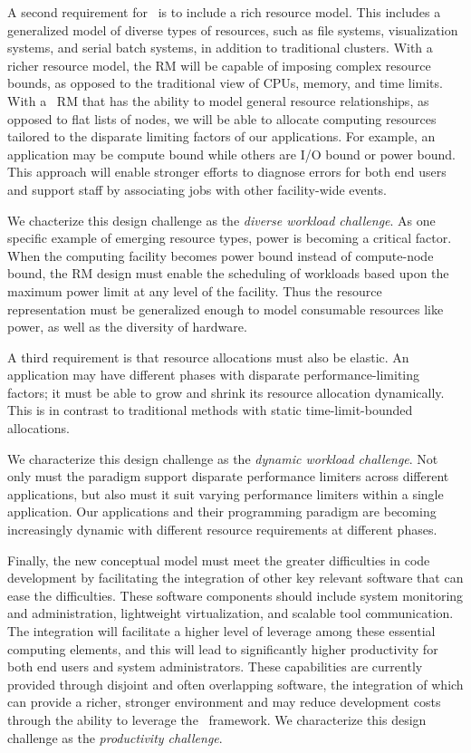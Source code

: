 A second requirement for \flux\ is to include a rich resource model.
This includes a generalized model of diverse types of resources,
such as file systems, visualization systems, and serial batch systems,
in addition to traditional clusters.   With a richer resource model,
the RM will be capable of imposing complex resource bounds,
as opposed to the traditional view of CPUs, memory, and time limits.
With a \flux\ RM that has the ability to model general resource
relationships, as opposed to flat lists of nodes, we will be able
to allocate computing resources tailored to the disparate limiting
factors of our applications.  For example, an application may be
compute bound while others are I/O bound or power bound.
This approach will enable stronger efforts to diagnose errors
for both end users and support staff by associating jobs
with other facility-wide events.

We chacterize this design challenge as the {\em diverse workload
challenge}.   As one specific example of emerging resource types,
power is becoming a critical factor. When the computing facility
becomes power bound instead of compute-node bound, the RM design
must enable the scheduling of workloads based upon the maximum
power limit at any level of the facility. Thus the resource
representation must be generalized enough to model consumable
resources like power, as well as the diversity of hardware.

A third requirement is that resource allocations
must also be elastic. An application may have different
phases with disparate performance-limiting factors;
it must be able to grow and shrink its resource allocation
dynamically.  This is in contrast to traditional methods with
static time-limit-bounded allocations.

We characterize this design challenge as the {\em dynamic workload
challenge}.  
Not only must the paradigm support disparate performance limiters
across different applications, but also must it suit varying
performance limiters within a single application. Our applications
and their programming paradigm are becoming increasingly dynamic with
different resource requirements at different phases.

Finally, the new conceptual model must meet the greater difficulties
in code development by facilitating the integration 
of other key relevant software that can ease the difficulties. 
These software components should include system monitoring
and administration, lightweight virtualization,
and scalable tool communication.
The integration will facilitate a higher level of
leverage among these essential computing elements,
and this will lead to significantly higher productivity
for both end users and system administrators.
These capabilities are currently provided
through disjoint and often overlapping software,
the integration of which can provide a richer, stronger environment
and may reduce development costs through the ability to leverage
the \flux\ framework.
We characterize this design challenge as the {\em productivity challenge}.

